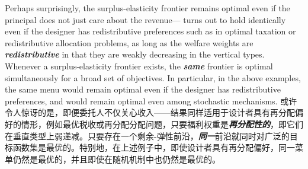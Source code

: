 \documentclass[12pt,letterpaper]{article}
\newenvironment{original}{\color{black}\noindent}{}
\newenvironment{translation}{\color{blue}\noindent}{}
\theoremstyle{plain}
\theoremstyle{definition}
\theoremstyle{remark}
\renewcommand{\1}{\mathds{1}}
\theoremstyle{definition}
\begin{document}
\begin{original}
Perhaps surprisingly, the surplus-elasticity frontier remains optimal even if the principal does not just care about the revenue--- turns out to hold identically even if the designer has redistributive preferences such as in optimal taxation or redistributive allocation problems, as long as the welfare weights are \textit{\textbf{redistributive}} in that they are weakly decreasing in the vertical types. Whenever a surplus-elasticity frontier exists, the \textit{\textbf{same}} frontier is optimal simultaneously for a broad set of objectives. In particular, in the above examples, the same menu would remain optimal even if the designer has redistributive preferences, and would remain optimal even among stochastic mechanisms.
\end{original}
\begin{translation}
或许令人惊讶的是，即便委托人不仅关心收入——结果同样适用于设计者具有再分配偏好的情形，例如最优税收或再分配分配问题，只要福利权重是\textit{\textbf{再分配性的}}，即它们在垂直类型上弱递减。只要存在一个剩余-弹性前沿，\textit{\textbf{同一}}前沿就同时对广泛的目标函数集是最优的。特别地，在上述例子中，即使设计者具有再分配偏好，同一菜单仍然是最优的，并且即使在随机机制中也仍然是最优的。
\end{translation}
\end{document}
